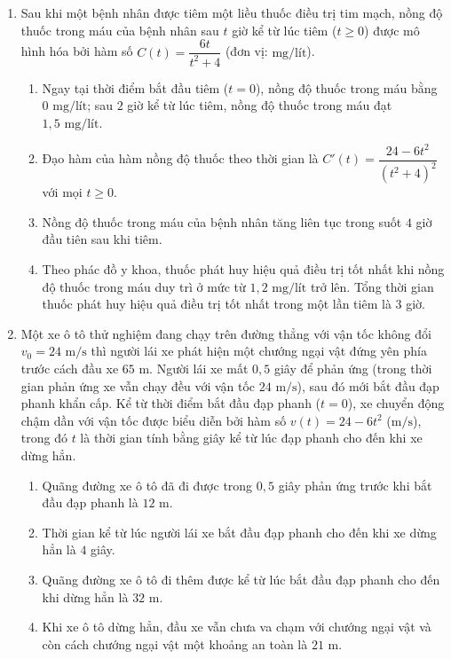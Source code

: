 \documentclass[12pt,a4paper]{article}
\begin{document}
\begin{enumerate}[label=\textbf{Câu \arabic*:}, leftmargin=*]

\item Sau khi một bệnh nhân được tiêm một liều thuốc điều trị tim mạch, nồng độ thuốc trong máu của bệnh nhân sau $t$ giờ kể từ lúc tiêm ($t \ge 0$) được mô hình hóa bởi hàm số $C(t) = \dfrac{6t}{t^2 + 4}$ (đơn vị: $\text{mg/lít}$).
\begin{enumerate}[label=\alph*)]
    \item Ngay tại thời điểm bắt đầu tiêm ($t = 0$), nồng độ thuốc trong máu bằng $0\text{ mg/lít}$; sau $2$ giờ kể từ lúc tiêm, nồng độ thuốc trong máu đạt $1{,}5\text{ mg/lít}$.
    \item Đạo hàm của hàm nồng độ thuốc theo thời gian là $C'(t) = \dfrac{24 - 6t^2}{(t^2 + 4)^2}$ với mọi $t \ge 0$.
    \item Nồng độ thuốc trong máu của bệnh nhân tăng liên tục trong suốt $4$ giờ đầu tiên sau khi tiêm.
    \item Theo phác đồ y khoa, thuốc phát huy hiệu quả điều trị tốt nhất khi nồng độ thuốc trong máu duy trì ở mức từ $1{,}2\text{ mg/lít}$ trở lên. Tổng thời gian thuốc phát huy hiệu quả điều trị tốt nhất trong một lần tiêm là $3$ giờ.
\end{enumerate}

\item Một xe ô tô thử nghiệm đang chạy trên đường thẳng với vận tốc không đổi $v_0 = 24\text{ m/s}$ thì người lái xe phát hiện một chướng ngại vật đứng yên phía trước cách đầu xe $65\text{ m}$. Người lái xe mất $0{,}5$ giây để phản ứng (trong thời gian phản ứng xe vẫn chạy đều với vận tốc $24\text{ m/s}$), sau đó mới bắt đầu đạp phanh khẩn cấp. Kể từ thời điểm bắt đầu đạp phanh ($t = 0$), xe chuyển động chậm dần với vận tốc được biểu diễn bởi hàm số $v(t) = 24 - 6t^2$ ($\text{m/s}$), trong đó $t$ là thời gian tính bằng giây kể từ lúc đạp phanh cho đến khi xe dừng hẳn.
\begin{enumerate}[label=\alph*)]
    \item Quãng đường xe ô tô đã đi được trong $0{,}5$ giây phản ứng trước khi bắt đầu đạp phanh là $12\text{ m}$.
    \item Thời gian kể từ lúc người lái xe bắt đầu đạp phanh cho đến khi xe dừng hẳn là $4$ giây.
    \item Quãng đường xe ô tô đi thêm được kể từ lúc bắt đầu đạp phanh cho đến khi dừng hẳn là $32\text{ m}$.
    \item Khi xe ô tô dừng hẳn, đầu xe vẫn chưa va chạm với chướng ngại vật và còn cách chướng ngại vật một khoảng an toàn là $21\text{ m}$.
\end{enumerate}


\end{enumerate}
\end{document}
